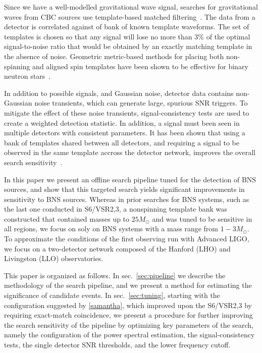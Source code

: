 Since we have a well-modelled gravitational wave signal, searches for gravitational waves from CBC sources use template-based matched filtering~\cite{Allen:2004gu}. The data from a detector is correlated against of bank of known template waveforms. The set of templates is chosen so that any signal will lose no more than $3\%$ of the optimal signal-to-noise ratio that would be obtained by an exactly matching template in the absence of noise. Geometric metric-based methods for placing both non-spinning and aligned spin templates have been shown to be effective for binary neutron stars~\cite{brown:2012qf}.

In addition to possible signals, and Gaussian noise, detector data contains non-Gaussian noise transients, which can generate large, spurious SNR triggers. To mitigate the effect of these noise transients, signal-consistency tests are used to create a weighted detection statistic. In addition, a signal must been seen in multiple detectors with consistent parameters. It has been shown that using a bank of templates shared between all detectors, and requiring a signal to be observed in the same template accross the detector network, improves the overall search sensitivity~\cite{samantha}. 

In this paper we present an offline search pipeline tuned for the detection of BNS sources, and show that this targeted search yields significant improvements in sensitivity to BNS sources. Whereas in prior searches for BNS systems, such as the last one conducted in S6/VSR2,3, a nonspinning template bank was constructed that contained masses up to $25M_\odot$ \cite{s6paper} and was tuned to be sensitive in all regions, we focus on soly on BNS systems with a mass range from $1-3 M_\odot$. To approximate the conditions of the first observing run with Advanced LIGO, we focus on a two-detector network composed of the Hanford (LHO) and Livingston (LLO) observatories.

This paper is organized as follows. In sec.~\ref{sec:pipeline} we describe the methodology of the search pipeline, and we present a method for estimating the significance of candidate events. In sec.~\ref{sec:tuning}, starting with the configuration suggested by \ref{samantha}, which improved upon the S6/VSR2,3 by requiring exact-match coincidence, we present a procedure for further improving the search sensitivity of the pipeline by optimizing key parameters of the search, namely the configuration of the power spectral estimation, the signal-consistency tests, the single detector SNR thresholds, and the lower frequency cutoff. 

